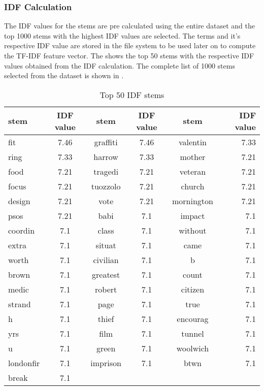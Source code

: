 \subsubsection{IDF Calculation}
The IDF values for the stems are pre calculated using the entire dataset and the top 1000 stems with the highest IDF values are selected. The terms and it's respective IDF value are stored in the file system to be used later on to compute the TF-IDF feature vector. The  shows the top 50 stems with the respective IDF values obtained from the IDF calculation. The complete list of 1000 stems selected from the dataset is shown in .

\begin{table}
\begin{center}
\caption{Top 50 IDF stems}
\label{tbl:idf_stems}
\begin{tabular}{@{}lc|cc|cr|@{}}
\toprule
stem&IDF value&stem&IDF value&stem&IDF value\\ \hline
\midrule
fit&7.46&graffiti&7.46&valentin&7.33\\ \hline 
ring&7.33&harrow&7.33&mother&7.21\\ \hline 
food&7.21&tragedi&7.21&veteran&7.21\\ \hline 
focus&7.21&tuozzolo&7.21&church&7.21\\ \hline 
design&7.21&vote&7.21&mornington&7.21\\ \hline 
psos&7.21&babi&7.1&impact&7.1\\ \hline 
coordin&7.1&class&7.1&without&7.1\\ \hline 
extra&7.1&situat&7.1&came&7.1\\ \hline 
worth&7.1&civilian&7.1&b&7.1\\ \hline 
brown&7.1&greatest&7.1&count&7.1\\ \hline 
medic&7.1&robert&7.1&citizen&7.1\\ \hline 
strand&7.1&page&7.1&true&7.1\\ \hline 
h&7.1&thief&7.1&encourag&7.1\\ \hline 
yrs&7.1&film&7.1&tunnel&7.1\\ \hline 
u&7.1&green&7.1&woolwich&7.1\\ \hline 
londonfir&7.1&imprison&7.1&btwn&7.1\\ \hline 
break&7.1&&&&\\ \hline 
\bottomrule
\end{tabular}
\end{center}
\end{table}

